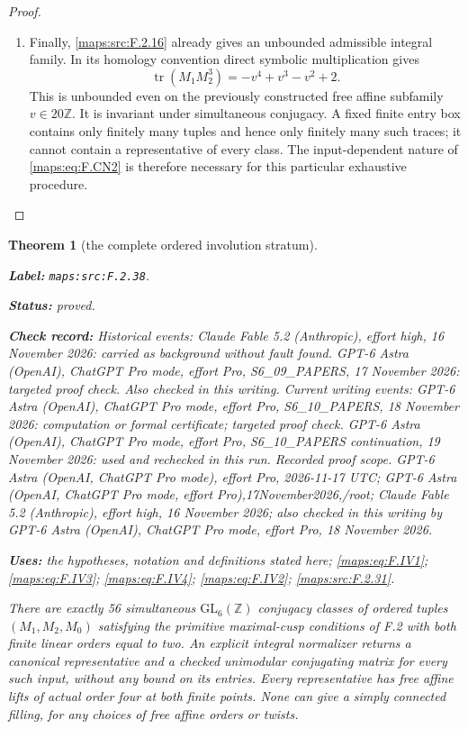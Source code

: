 \documentclass[11pt,a4paper]{article}
\newtheorem{theorem}{Theorem}[section]
\theoremstyle{definition}
\newcommand{\StatementRecord}[4]{\par\smallskip\begingroup\upshape\raggedright\noindent\textbf{Label:} \nolinkurl{#1}.\par\noindent\textbf{Status:} #2.\par\noindent\textbf{Check record:} #3.\par\noindent\textbf{Uses:} #4.\par\endgroup\smallskip}
\begin{document}
\begin{proof}
\begin{enumerate}[label=\arabic*.]
\item Finally, \ref{maps:src:F.2.16} already gives an unbounded admissible integral
family. In its homology convention direct symbolic
multiplication gives
\[
             \operatorname{tr}(M_1M_2^3)
                       =-v^4+v^3-v^2+2.                 \tag{F.CN3}\label{maps:eq:F.CN3}
\]
This is unbounded even on the previously constructed free
affine subfamily $v\in20\mathbb Z$. It is invariant under
simultaneous conjugacy. A fixed finite entry box contains
only finitely many tuples and hence only finitely many such
traces; it cannot contain a representative of every class.
The input-dependent nature of \eqref{maps:eq:F.CN2} is therefore necessary
for this particular exhaustive procedure.

\end{enumerate}
\end{proof}




\begin{theorem}[the complete ordered involution stratum]\label{maps:src:F.2.38}
\StatementRecord{maps:src:F.2.38}{proved}{Historical events: Claude Fable 5.2 (Anthropic), effort high, 16 November 2026: carried as background without fault found. GPT-6 Astra (OpenAI), ChatGPT Pro mode, effort Pro, S6\_09\_PAPERS, 17 November 2026: targeted proof check. Also checked in this writing. Current writing events: GPT-6 Astra (OpenAI), ChatGPT Pro mode, effort Pro, S6\_10\_PAPERS, 18 November 2026: computation or formal certificate; targeted proof check. GPT-6 Astra (OpenAI), ChatGPT Pro mode, effort Pro, S6\_10\_PAPERS continuation, 19 November 2026: used and rechecked in this run. \emph{Recorded proof scope.} GPT-6 Astra (OpenAI, ChatGPT Pro mode), effort Pro, 2026-11-17 UTC; GPT-6 Astra (OpenAI, ChatGPT Pro mode, effort Pro),17November2026,/root; Claude Fable 5.2 (Anthropic), effort high, 16 November 2026; also checked in this writing by GPT-6 Astra (OpenAI), ChatGPT Pro mode, effort Pro, 18 November 2026}{the hypotheses, notation and definitions stated here; \cref{maps:eq:F.IV1}; \cref{maps:eq:F.IV3}; \cref{maps:eq:F.IV4}; \cref{maps:eq:F.IV2}; \cref{maps:src:F.2.31}}


There are exactly 56 simultaneous $\mathrm{GL}_6(\mathbb Z)$
conjugacy classes of ordered tuples $(M_1,M_2,M_0)$ satisfying
the primitive maximal-cusp conditions of F.2 with both finite
linear orders equal to two.  An explicit integral normalizer
returns a canonical representative and a checked unimodular
conjugating matrix for every such input, without any bound on
its entries.  Every representative has free affine lifts of
actual order four at both finite points.  None can give a
simply connected filling, for any choices of free affine
orders or twists.

\end{theorem}
\end{document}
